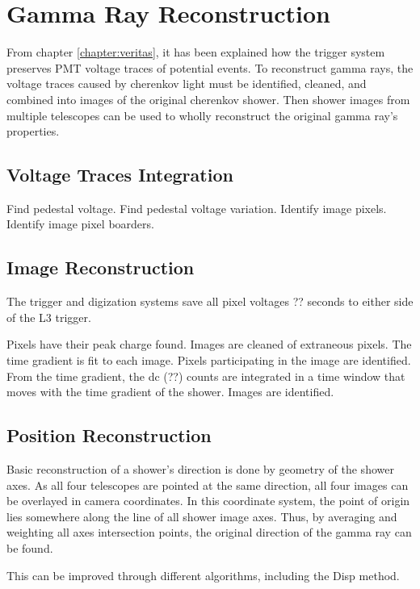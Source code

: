 \cleartooddpage[\thispagestyle{empty}]
\chapter{Gamma Ray Reconstruction}\label{ch:grrecon}

From chapter \ref{chapter:veritas}, it has been explained how the trigger system preserves PMT voltage traces of potential events.
To reconstruct gamma rays, the voltage traces caused by cherenkov light must be identified, cleaned, and combined into images of the original cherenkov shower.
Then shower images from multiple telescopes can be used to wholly reconstruct the original gamma ray's properties.

\section{Voltage Traces Integration}
Find pedestal voltage.
Find pedestal voltage variation.
Identify image pixels.
Identify image pixel boarders.

\section{Image Reconstruction}\label{subsec:imgrecon}

The trigger and digization systems save all pixel voltages ?? seconds to either side of the L3 trigger.

Pixels have their peak charge found.
Images are cleaned of extraneous pixels.
The time gradient is fit to each image.
Pixels participating in the image are identified.
From the time gradient, the dc (??) counts are integrated in a time window that moves with the time gradient of the shower.
Images are identified.

\section{Position Reconstruction}\label{subsec:posrecon}
Basic reconstruction of a shower's direction is done by geometry of the shower axes.
As all four telescopes are pointed at the same direction, all four images can be overlayed in camera coordinates.
In this coordinate system, the point of origin lies somewhere along the line of all shower image axes.
Thus, by averaging and weighting all axes intersection points, the original direction of the gamma ray can be found.

This can be improved through different algorithms, including the Disp method.

